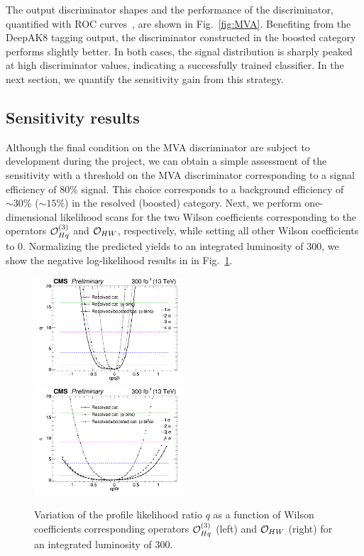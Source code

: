 \documentclass[a4paper,11pt]{article}
\begin{document}
The output discriminator shapes and the performance of the discriminator, quantified with ROC curves~\cite{FAWCETT2006861}, are shown in Fig.~\ref{fig:MVA}. 
Benefiting from the DeepAK8 tagging output, the discriminator constructed in the boosted category performs slightly better. In both cases, the signal distribution is sharply peaked at high discriminator values, indicating a successfully trained classifier.
In the next section, we quantify the sensitivity gain from this strategy.

\subsection{Sensitivity results}

Although the final condition on the MVA discriminator are subject to development during the project, 
we can obtain a simple assessment of the sensitivity with a threshold on the MVA discriminator corresponding to a signal efficiency of $80\%$ signal.
This choice corresponds to a background efficiency of $\sim 30\%$ ($\sim 15\%$) in the resolved (boosted) category.
Next, we perform one-dimensional likelihood scans for the two Wilson coefficients corresponding to the operators ${\cal O}^{(3)}_{Hq}$ and ${\cal O}_{HW}$, respectively, while setting all other Wilson coefficients to $0$. 
Normalizing the predicted yields to an integrated luminosity of 300\fbinv, we show the negative log-likelihood results in in Fig.~\ref{fig:NLL}. %
\begin{figure}[hbtp]
\begin{center}
\includegraphics[width=0.495\textwidth]{Figures/RECO/Full_NLL_WC_cpq3i_fine_300fb_opt1.png}
\includegraphics[width=0.495\textwidth]{Figures/RECO/Full_NLL_WC_cpW_fine_300fb.png}
\end{center}
\caption{
Variation of the profile likelihood ratio $q$ as a function of Wilson coefficients corresponding operators ${\cal O}^{(3)}_{Hq}$ (left) and ${\cal O}_{HW}$ (right) for an integrated luminosity of 300\fbinv.
}
\label{fig:NLL}
\end{figure}
\end{document}
